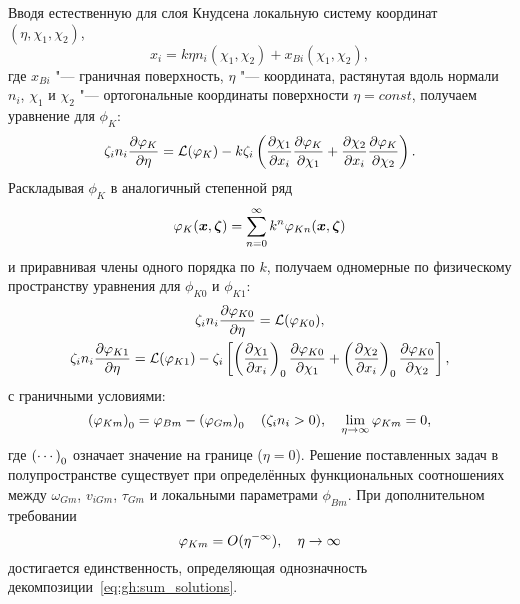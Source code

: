 Вводя естественную для слоя Кнудсена локальную систему координат \((\eta,\chi_1,\chi_2)\),
\begin{equation}\label{eq:eta_definition}
    x_i = k\eta n_i(\chi_1,\chi_2) + x_{Bi}(\chi_1,\chi_2),
\end{equation}
где \(x_{Bi}\) "--- граничная поверхность, \(\eta\) "--- координата, растянутая вдоль нормали \(n_i\),
\(\chi_1\) и \(\chi_2\) "--- ортогональные координаты поверхности \(\eta=const\),
получаем уравнение для \(\phi_K\):
\begin{equation}\label{eq:gh:knudsen_equation}
    \zeta_in_i\pder[\phi_K]{\eta} = \mathcal{L}(\phi_K)
    - k\zeta_i\left(\pder[\chi_1]{x_i}\pder[\phi_K]{\chi_1} + \pder[\chi_2]{x_i}\pder[\phi_K]{\chi_2}\right).
\end{equation}
Раскладывая \(\phi_K\) в аналогичный степенной ряд
\begin{equation}\label{eq:gh:phiK_sum}
    \phi_K(\bx,\bzeta) = \sum_{n=0}^\infty k^n \phi_{Kn}(\bx,\bzeta)
\end{equation}
и приравнивая члены одного порядка по \(k\), получаем одномерные по физическому пространству
уравнения для \(\phi_{K0}\) и \(\phi_{K1}\):
\begin{gather}
    \zeta_in_i\pder[\phi_{K0}]{\eta} = \mathcal{L}(\phi_{K0}), \label{eq:gh:knlayer0}\\
    \zeta_in_i\pder[\phi_{K1}]{\eta} = \mathcal{L}(\phi_{K1})
        - \zeta_i\left[ \onwall{\pder[\chi_1]{x_i}} \pder[\phi_{K0}]{\chi_1}
            + \onwall{\pder[\chi_2]{x_i}} \pder[\phi_{K0}]{\chi_2}
        \right], \label{eq:gh:knlayer1}
\end{gather}
с граничными условиями:
\begin{equation}\label{eq:gh:phiK_bc}
    \onwall{\phi_{Km}} = \phi_{Bm} - \onwall{\phi_{Gm}} \quad (\zeta_in_i>0),
        \quad \lim_{\eta\to\infty} \phi_{Km} = 0,
\end{equation}
где \(\onwall{\cdots}\) означает значение на границе (\(\eta=0\)).
Решение поставленных задач в полупространстве существует при определённых функциональных соотношениях
между \(\omega_{Gm}\), \(v_{iGm}\), \(\tau_{Gm}\) и локальными параметрами \(\phi_{Bm}\).
При дополнительном требовании
\begin{equation}\label{eq:gh:phiK_exp_decay}
    \phi_{Km} = \OO{\eta^{-\infty}}, \quad \eta\to\infty
\end{equation}
достигается единственность, определяющая однозначность декомпозиции~\eqref{eq:gh:sum_solutions}.

